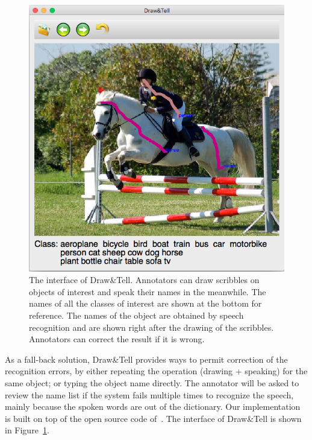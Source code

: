 \begin{figure}[!tb]
\centering
\includegraphics[width=0.8\linewidth]{./draw_and_tell/figSM/draw_tell_interface.png} 
\caption{The interface of Draw\&Tell.  Annotators can draw scribbles on objects of interest and speak their names in the meanwhile. The names of all the classes of interest are shown at the bottom for reference. The names of the object are obtained by speech recognition and are shown right after the drawing of the scribbles. Annotators can correct the result if it is wrong.}
\label{fig:drawtell:interface}
\end{figure}


As a fall-back solution, Draw\&Tell provides ways to permit correction of the recognition errors, by either repeating the operation (drawing + speaking) for the same object;
or typing the object name directly.  The annotator will be asked to
review the name list if the system fails multiple times to recognize
the speech, mainly because the spoken words are out of the dictionary.  
Our implementation is built on top of the open source code of~\citep{lexfree2015}. 
The interface of Draw\&Tell is shown in Figure~\ref{fig:drawtell:interface}. 



